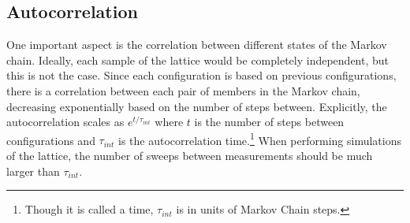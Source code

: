 \subsection{Autocorrelation}
One important aspect is the correlation between different states of the Markov chain. Ideally, each sample of the lattice would be completely independent, but this is not the case. Since each configuration is based on previous configurations, there is a correlation between each pair of members in the Markov chain, decreasing exponentially based on the number of steps between. Explicitly, the autocorrelation scales as $e^{t/\tau_{int}}$ where $t$ is the number of steps between configurations and $\tau_{int}$ is the autocorrelation time.\footnote{Though it is called a time, $\tau_{int}$ is in units of Markov Chain steps.} When performing simulations of the lattice, the number of sweeps between measurements should be much larger than $\tau_{int}$. 

